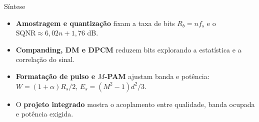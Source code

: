 \documentclass[aspectratio=169]{beamer}
\newcommand{\SQNR}{\mathrm{SQNR}}
\begin{document}
\begin{frame}{Síntese}
  \small
  \begin{itemize}
    \item \textbf{Amostragem e quantização} fixam a taxa de bits
          $R_b=n f_s$ e o $\SQNR\approx6{,}02n+1{,}76$ dB.
    \item \textbf{Companding, DM e DPCM} reduzem bits explorando a estatística
          e a correlação do sinal.
    \item \textbf{Formatação de pulso e $M$-PAM} ajustam banda e potência:
          $W=(1+\alpha)R_s/2$, $E_s=(M^2-1)d^2/3$.
    \item O \textbf{projeto integrado} mostra o acoplamento entre qualidade,
          banda ocupada e potência exigida.
  \end{itemize}
\end{frame}
\end{document}
